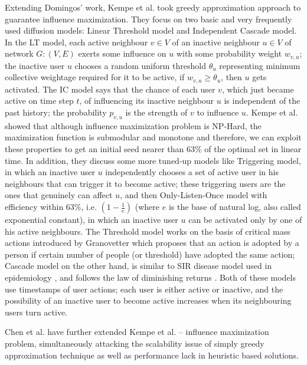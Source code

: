 		Extending Domingos’ work, Kempe et al. \cite{kempe2003} took greedy approximation approach to guarantee influence maximization. They focus on two basic and very frequently used diffusion models: Linear Threshold model and Independent Cascade model. In the LT model, each active neighbour $v\in V$ of an inactive neighbour $u\in V$ of network $G:(V,E)$ exerts some influence on $u$ with some probability weight $w_{v,u}$; the inactive user $u$ chooses a random uniform threshold $\theta_u$ representing minimum collective weightage required for it to be active, if $w_{v,u}\ge \theta_u$, then $u$ gets activated. The IC model says that the chance of each user $v$, which just became active on time step $t$, of influencing its inactive neighbour $u$ is independent of the past history; the probability $p_{v,u}$ is the strength of $v$ to influence $u$. Kempe et al. showed that although influence maximization problem is NP-Hard, the maximization function is submodular and monotone and therefore, we can exploit these properties to get an initial seed nearer than 63\% of the optimal set in linear time. In addition, they discuss some more tuned-up models like Triggering model, in which an inactive user $u$ independently chooses a set of active user in his neighbours that can trigger it to become active; these triggering users are the ones that genuinely can affect $u$, and then Only-Listen-Once model with efficiency within 63\%, i.e. \textit{$(1-\frac{1}{e})$} (where $e$ is the base of natural log, also called exponential constant), in which an inactive user $u$ can be activated only by one of his active neighbours. The Threshold model works on the basis of critical mass actions introduced by Granovetter \cite{granovetter1978} which proposes that an action is adopted by a person if certain number of people (or threshold) have adopted the same action; Cascade model on the other hand, is similar to SIR disease model used in epidemiology \cite{hethcote1989}, and follows the law of diminishing returns \cite{goldenberg2001}. Both of these models use timestamps of user actions; each user is either active or inactive, and the possibility of an inactive user to become active increases when its neighbouring users turn active.
	
		Chen et al. \cite{chen2010} have further extended Kempe et al. – influence maximization problem, simultaneously attacking the scalability issue of simply greedy approximation technique as well as performance lack in heuristic based solutions. %
		
